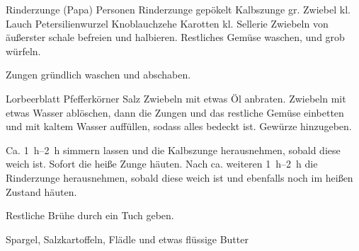 \begin{MyRecipe}{Rinderzunge (Papa)}{ Personen}{}
	\ingredient[\Calc{1}{\x}]{} {Rinderzunge gepökelt}
	\ingredient[\Calc{1}{\x}]{} {Kalbszunge}
	\ingredient[\Calc{1}{\x}]{} {gr. Zwiebel}
	\ingredient[\Calc{1}{\x}]{} {kl. Lauch}
	\ingredient[\Calc{1}{\x}]{} {Petersilienwurzel}
	\ingredient[\Calc{1}{\x}]{} {Knoblauchzehe}
	\ingredient[\Calc{2}{\x}]{} {Karotten}
	\ingredient[\Calc{0.5}{\x}]{} {kl. Sellerie}
	Zwiebeln von äußerster schale befreien und halbieren. Restliches Gemüse waschen, und grob würfeln.

	Zungen gründlich waschen und abschaben.\par\bigskip
	
	\ingredient[\Calc{1}{\x}]{} {Lorbeerblatt}
	 {Pfefferkörner}
	 {Salz}
	Zwiebeln mit etwas Öl anbraten. Zwiebeln mit etwas Wasser ablöschen, dann die Zungen und das restliche Gemüse einbetten und mit kaltem Wasser auffüllen, sodass alles bedeckt ist.
	Gewürze hinzugeben.\par\bigskip
	
	Ca. \SIrange{1}{2}{\hour} simmern lassen und die Kalbszunge herausnehmen, sobald diese weich ist. Sofort die heiße Zunge häuten. Nach ca. weiteren \SIrange{1}{2}{\hour} die Rinderzunge herausnehmen, sobald diese weich ist und ebenfalls noch im heißen Zustand häuten.

	Restliche Brühe durch ein Tuch geben.\par\bigskip

	Spargel, Salzkartoffeln, Flädle und etwas flüssige Butter
	

	
	
	
\end{MyRecipe}